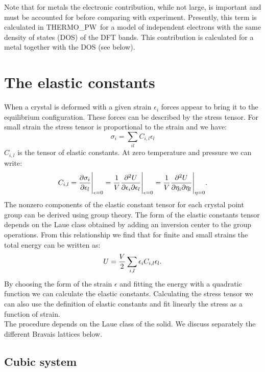 \documentclass[12pt,a4paper]{article}
\def\tpw{{\sc THERMO\_PW}}
\begin{document}
Note that for metals the electronic contribution, while not large, is important 
and must be accounted for before comparing with experiment. Presently,
this term is calculated in \tpw\ for a model of independent electrons with
the same density of states (DOS) of the DFT bands. This contribution is 
calculated for a metal together with the DOS (see below).

\newpage
\section{\color{coral}The elastic constants}

When a crystal is deformed with a given strain $\epsilon_i$ forces
appear to bring it to the equilibrium configuration. These
forces can be described by the stress tensor. For small strain the 
stress tensor is proportional to the strain and we have:
\begin{equation}
\sigma_{i} =\sum_{il} C_{i,l} \epsilon_l 
\end{equation}
$C_{i,l}$ is the tensor of elastic constants. 
At zero temperature and pressure we can write:
\begin{equation}
C_{i,l}= {\partial \sigma_i \over \partial \epsilon_{l}}\Bigg|_{\epsilon=0}=
{1 \over V}{\partial^2 U \over \partial \epsilon_i \partial \epsilon_l}
\Bigg|_{\epsilon=0} = 
{1 \over V}{\partial^2 U \over \partial \eta_i \partial \eta_l}
\Bigg|_{\eta=0}
.
\end{equation}
The nonzero components of the elastic constant tensor for each crystal point
group can be derived using group theory. The form of the elastic constants
tensor depends on the Laue class obtained by adding an inversion center to
the group operations. From this relationship we find that for finite
and small strains the total energy can be written as:
\begin{equation}
U= {V \over 2} \sum_{i,l} \epsilon_i C_{i,l} \epsilon_l.
\end{equation}
By choosing the form of the strain $\epsilon$ and fitting the
energy with a quadratic function we can calculate the elastic constants.
Calculating the stress tensor we can also use the definition
of elastic constants and fit linearly the stress as a function of strain. \\
The procedure depends on the Laue class of the solid. We discuss separately
the different Bravais lattices below.

\subsection{\color{web-blue}Cubic system}
\end{document}
